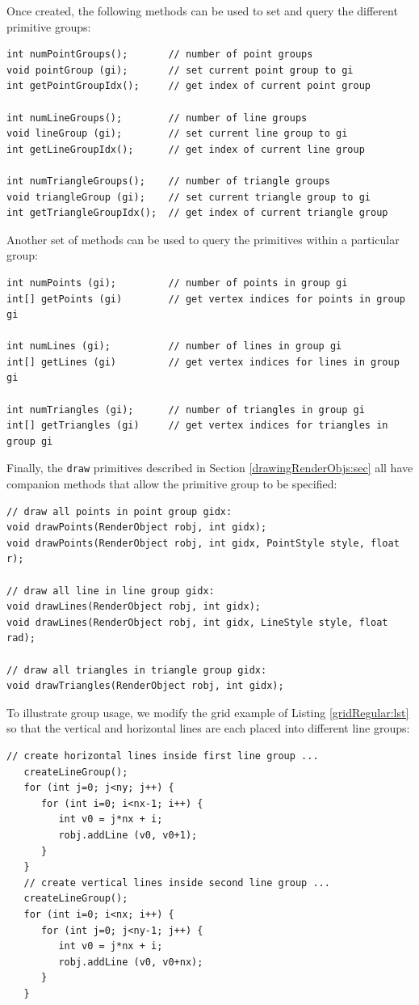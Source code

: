 Once created, the following methods can be used to set and
query the different primitive groups:
%
\begin{lstlisting}[]
int numPointGroups();       // number of point groups
void pointGroup (gi);       // set current point group to gi
int getPointGroupIdx();     // get index of current point group

int numLineGroups();        // number of line groups
void lineGroup (gi);        // set current line group to gi
int getLineGroupIdx();      // get index of current line group

int numTriangleGroups();    // number of triangle groups
void triangleGroup (gi);    // set current triangle group to gi
int getTriangleGroupIdx();  // get index of current triangle group
\end{lstlisting}
%
Another set of methods can be used to query the primitives within a
particular group:
%
\begin{lstlisting}[]
int numPoints (gi);         // number of points in group gi
int[] getPoints (gi)        // get vertex indices for points in group gi

int numLines (gi);          // number of lines in group gi
int[] getLines (gi)         // get vertex indices for lines in group gi

int numTriangles (gi);      // number of triangles in group gi
int[] getTriangles (gi)     // get vertex indices for triangles in group gi
\end{lstlisting}
%
Finally, the {\tt draw} primitives described in Section
\ref{drawingRenderObjs:sec} all have companion methods that allow the
primitive group to be specified:
%
\begin{lstlisting}
// draw all points in point group gidx:
void drawPoints(RenderObject robj, int gidx);
void drawPoints(RenderObject robj, int gidx, PointStyle style, float r);

// draw all line in line group gidx:
void drawLines(RenderObject robj, int gidx);
void drawLines(RenderObject robj, int gidx, LineStyle style, float rad);

// draw all triangles in triangle group gidx:
void drawTriangles(RenderObject robj, int gidx);
\end{lstlisting}
%
To illustrate group usage, we modify the grid example
of Listing \ref{gridRegular:lst} so that the vertical and horizontal
lines are each placed into different line groups:
%
\begin{lstlisting}[]
   // create horizontal lines inside first line group ...
   createLineGroup();
   for (int j=0; j<ny; j++) {
      for (int i=0; i<nx-1; i++) {
         int v0 = j*nx + i;
         robj.addLine (v0, v0+1);
      }
   }
   // create vertical lines inside second line group ...
   createLineGroup();
   for (int i=0; i<nx; i++) {
      for (int j=0; j<ny-1; j++) {
         int v0 = j*nx + i;
         robj.addLine (v0, v0+nx);
      }
   }
\end{lstlisting}

